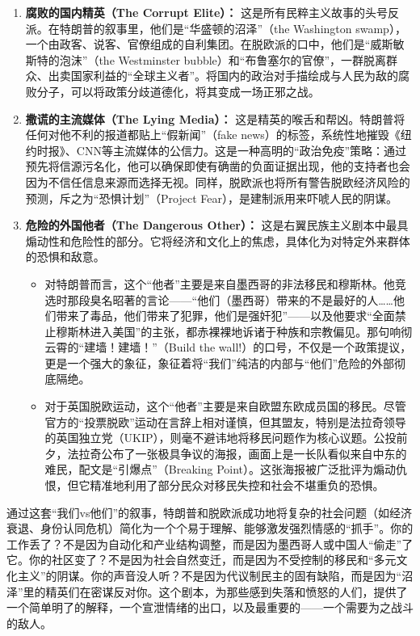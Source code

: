 \begin{enumerate}
    \item \textbf{腐败的国内精英（The Corrupt Elite）：} 这是所有民粹主义故事的头号反派。在特朗普的叙事里，他们是“华盛顿的沼泽”（the Washington swamp），一个由政客、说客、官僚组成的自利集团。在脱欧派的口中，他们是“威斯敏斯特的泡沫”（the Westminster bubble）和“布鲁塞尔的官僚”，一群脱离群众、出卖国家利益的“全球主义者”。将国内的政治对手描绘成与人民为敌的腐败分子，可以将政策分歧道德化，将其变成一场正邪之战。
    \item \textbf{撒谎的主流媒体（The Lying Media）：} 这是精英的喉舌和帮凶。特朗普将任何对他不利的报道都贴上“假新闻”（fake news）的标签，系统性地摧毁《纽约时报》、CNN等主流媒体的公信力。这是一种高明的“政治免疫”策略：通过预先将信源污名化，他可以确保即使有确凿的负面证据出现，他的支持者也会因为不信任信息来源而选择无视。同样，脱欧派也将所有警告脱欧经济风险的预测，斥之为“恐惧计划”（Project Fear），是建制派用来吓唬人民的阴谋。
    \item \textbf{危险的外国他者（The Dangerous Other）：} 这是右翼民族主义剧本中最具煽动性和危险性的部分。它将经济和文化上的焦虑，具体化为对特定外来群体的恐惧和敌意。
    \begin{itemize}
        \item 对特朗普而言，这个“他者”主要是来自墨西哥的非法移民和穆斯林。他竞选时那段臭名昭著的言论——“他们（墨西哥）带来的不是最好的人……他们带来了毒品，他们带来了犯罪，他们是强奸犯”——以及他要求“全面禁止穆斯林进入美国”的主张，都赤裸裸地诉诸于种族和宗教偏见。那句响彻云霄的“建墙！建墙！”（Build the wall!）的口号，不仅是一个政策提议，更是一个强大的象征，象征着将“我们”纯洁的内部与“他们”危险的外部彻底隔绝。
        \item 对于英国脱欧运动，这个“他者”主要是来自欧盟东欧成员国的移民。尽管官方的“投票脱欧”运动在言辞上相对谨慎，但其盟友，特别是法拉奇领导的英国独立党（UKIP），则毫不避讳地将移民问题作为核心议题。公投前夕，法拉奇公布了一张极具争议的海报，画面上是一长队看似来自中东的难民，配文是“引爆点”（Breaking Point）。这张海报被广泛批评为煽动仇恨，但它精准地利用了部分民众对移民失控和社会不堪重负的恐惧。
    \end{itemize}
\end{enumerate}

通过这套“我们vs他们”的叙事，特朗普和脱欧派成功地将复杂的社会问题（如经济衰退、身份认同危机）简化为一个个易于理解、能够激发强烈情感的“抓手”。你的工作丢了？不是因为自动化和产业结构调整，而是因为墨西哥人或中国人“偷走”了它。你的社区变了？不是因为社会自然变迁，而是因为不受控制的移民和“多元文化主义”的阴谋。你的声音没人听？不是因为代议制民主的固有缺陷，而是因为“沼泽”里的精英们在密谋反对你。这个剧本，为那些感到失落和愤怒的人们，提供了一个简单明了的解释，一个宣泄情绪的出口，以及最重要的——一个需要为之战斗的敌人。

